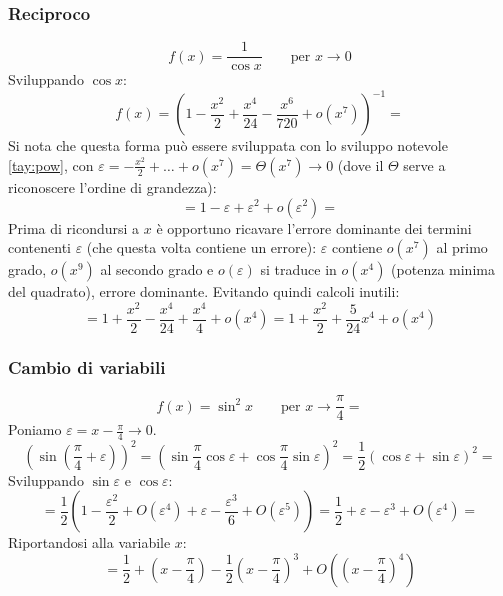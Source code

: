\subsubsection{Reciproco}
\begin{examp}
	\[
		f(x)=\frac{1}{\cos x}\qquad\text{per $x\to0$}
	\]
	Sviluppando $\cos x$:
	\[
		f(x)=\left(1-\frac{x^2}{2}+\frac{x^4}{24}-\frac{x^6}{720}+o(x^7)\right)^{-1}=
	\]
	Si nota che questa forma può essere sviluppata con lo sviluppo notevole \ref{tay:pow}, con $\varepsilon=-\frac{x^2}{2}+\dots+o(x^7)=\Theta(x^7)\to0$ (dove il $\Theta$ serve a riconoscere l'ordine di grandezza):
	\[
		=1-\varepsilon+\varepsilon^2+o(\varepsilon^2)=
	\]
	Prima di ricondursi a $x$ è opportuno ricavare l'errore dominante dei termini contenenti $\varepsilon$ (che questa volta contiene un errore): $\varepsilon$ contiene $o(x^7)$ al primo grado, $o(x^9)$ al secondo grado e $o(\varepsilon)$ si traduce in $o(x^4)$ (potenza minima del quadrato), errore dominante. Evitando quindi calcoli inutili:
	\[
		=1+\frac{x^2}{2}-\frac{x^4}{24}+\frac{x^4}{4}+o(x^4)=1+\frac{x^2}{2}+\frac{5}{24}x^4+o(x^4)
	\]
\end{examp}

\subsubsection{Cambio di variabili}
\begin{examp}
	\[
		f(x)=\sin^2 x\qquad\text{per $x\to\frac{\pi}{4}$}=
	\]
	Poniamo $\varepsilon=x-\frac{\pi}{4}\to0$.
	\[
		\left(\sin\left(\frac{\pi}{4}+\varepsilon\right)\right)^2=\left(\sin\frac{\pi}{4}\cos\varepsilon+\cos\frac{\pi}{4}\sin\varepsilon\right)^2=\frac{1}{2}(\cos\varepsilon+\sin\varepsilon)^2=
	\]
	Sviluppando $\sin\varepsilon$ e $\cos\varepsilon$:
	\[
		=\frac{1}{2}\left(1-\frac{\varepsilon^2}{2}+O(\varepsilon^4)+\varepsilon-\frac{\varepsilon^3}{6}+O(\varepsilon^5)\right)=\frac{1}{2}+\varepsilon-\varepsilon^3+O(\varepsilon^4)=
	\]
	Riportandosi alla variabile $x$:
	\[
		=\frac{1}{2}+\left(x-\frac{\pi}{4}\right)-\frac{1}{2}\left(x-\frac{\pi}{4}\right)^3+O(\left(x-\frac{\pi}{4}\right)^4)
	\]
\end{examp}


